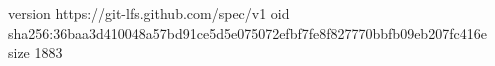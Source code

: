 version https://git-lfs.github.com/spec/v1
oid sha256:36baa3d410048a57bd91ce5d5e075072efbf7fe8f827770bbfb09eb207fc416e
size 1883
